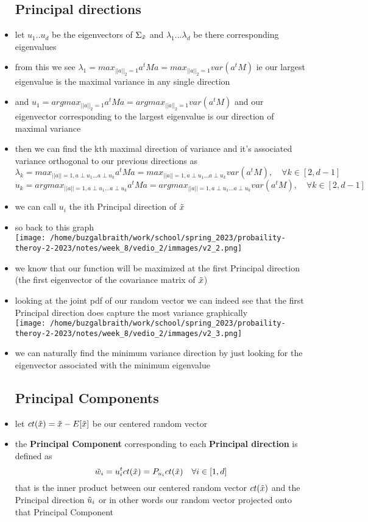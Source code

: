\documentclass{article}
\begin{document}
\begin{itemize}
\subsection*{Principal directions}
\item let $u_1..u_d$ be the eigenvectors of $\Sigma_{\Tilde{x}}$ and $\lambda_1...\lambda_d$ be there corresponding eigenvalues
\item from this we see $\lambda_1=max_{||a||_{2}=1}a^tMa=max_{||a||_{2}=1}var(a^tM)$ ie our largest eigenvalue is the maximal variance in any single direction
\item and $u_1=argmax_{||a||_{2}=1}a^tMa=argmax_{||a||_{2}=1}var(a^tM)$ and our eigenvector corresponding to the largest eigenvalue is our direction of maximal variance
\item  then we can find the kth maximal direction of variance and it's associated variance orthogonal to our previous directions as $$\lambda_{k}=max_{||a||=1, a\perp u_1 \dots a\perp u_k}a^tMa=max_{||a||=1, a\perp u_1 \dots a\perp u_k}var(a^tM), \quad \forall k \in [2,d-1]$$
$$u_{k}=argmax_{||a||=1, a\perp u_1 \dots a\perp u_k}a^tMa=argmax_{||a||=1, a\perp u_1 \dots a\perp u_k}var(a^tM), \quad \forall k \in [2,d-1]$$
\item we can call $u_{i}$ the ith Principal direction of $\Tilde{x}$
\item so back to this graph \\ \texttt{[image: /home/buzgalbraith/work/school/spring\_2023/probaility-theroy-2-2023/notes/week\_8/vedio\_2/immages/v2\_2.png]}
\item we know that our function will be maximized at the first Principal direction (the first eigenvector of the covariance matrix of $\Tilde{x}$)
\item looking at the joint pdf of our random vector we can indeed see that the first Principal direction does capture the most variance graphically \\ \texttt{[image: /home/buzgalbraith/work/school/spring\_2023/probaility-theroy-2-2023/notes/week\_8/vedio\_2/immages/v2\_3.png]}
\item we can naturally find the minimum variance direction by just looking for the eigenvector associated with the minimum eigenvalue
\subsection*{Principal Components}
\item let $ct(\Tilde{x})=\Tilde{x}-E[\Tilde{x}]$ be our centered random vector
\item the \textbf{Principal Component} corresponding to each \textbf{Principal direction} is defined as 
$$\Tilde{w}_{i}=u_{i}^{t}ct(\Tilde{x})= P_{u_{i}}ct(\Tilde{x})\quad \forall i\in [1,d]$$ that is the inner product between our centered random vector $ct(\Tilde{x})$ and the Principal direction $\Tilde{u}_{i}$ or in other words our random vector projected onto that Principal Component

\end{itemize}
\end{document}
